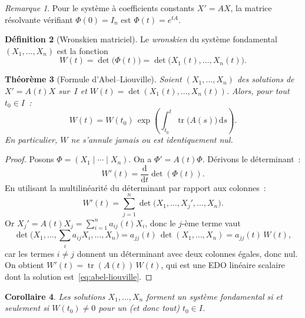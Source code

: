 \documentclass[12pt,a4paper,openany]{book}
\theoremstyle{definition}
\newtheorem{definition}{Définition}[chapter]
\theoremstyle{plain}
\newtheorem{theoreme}[definition]{Théorème}
\newtheorem{corollaire}[definition]{Corollaire}
\theoremstyle{remark}
\newtheorem{remarque}[definition]{Remarque}
\newcommand{\dd}{\mathrm{d}}
\DeclareMathOperator{\tr}{tr}
\begin{document}
\begin{remarque}\label{rem:resolvante-exp}
  Pour le système à coefficients constants $X' = AX$, la matrice
  résolvante vérifiant $\Phi(0) = I_n$ est $\Phi(t) = e^{tA}$.
\end{remarque}

\begin{definition}[Wronskien matriciel]\label{def:wronskien-matriciel}
  Le \emph{wronskien} du système fondamental $(X_1,\ldots,X_n)$ est
  la fonction
  \[
    W(t) = \det\bigl(\Phi(t)\bigr) = \det\bigl(X_1(t),\ldots,X_n(t)\bigr).
  \]
\end{definition}

\begin{theoreme}[Formule d'Abel--Liouville]\label{thm:abel-liouville}
  Soient $(X_1,\ldots,X_n)$ des solutions de $X' = A(t)X$ sur~$I$ et
  $W(t) = \det(X_1(t),\ldots,X_n(t))$. Alors, pour tout $t_0 \in I$~:
  \begin{equation}\label{eq:abel-liouville}
    W(t) = W(t_0)\,\exp\!\left(\int_{t_0}^{t} \tr\bigl(A(s)\bigr)\,\dd s\right).
  \end{equation}
  En particulier, $W$ ne s'annule jamais ou est identiquement nul.
\end{theoreme}

\begin{proof}
  Posons $\Phi = (X_1 \mid \cdots \mid X_n)$. On a
  $\Phi' = A(t)\Phi$. Dérivons le déterminant~:
  \[
    W'(t) = \frac{\dd}{\dd t}\det(\Phi(t)).
  \]
  En utilisant la multilinéarité du déterminant par rapport aux colonnes~:
  \[
    W'(t) = \sum_{j=1}^{n} \det\bigl(X_1,\ldots,X_j',\ldots,X_n\bigr).
  \]
  Or $X_j' = A(t)X_j = \sum_{i=1}^n a_{ij}(t) X_i$, donc le $j$-ème
  terme vaut
  \[
    \det\bigl(X_1,\ldots,\textstyle\sum_i a_{ij} X_i,\ldots,X_n\bigr)
    = a_{jj}(t)\,\det(X_1,\ldots,X_n) = a_{jj}(t)\,W(t),
  \]
  car les termes $i \neq j$ donnent un déterminant avec deux colonnes
  égales, donc nul. On obtient $W'(t) = \tr(A(t))\,W(t)$, qui est
  une EDO linéaire scalaire dont la solution est~\eqref{eq:abel-liouville}.
\end{proof}

\begin{corollaire}\label{cor:wronskien-non-nul}
  Les solutions $X_1,\ldots,X_n$ forment un système fondamental si et
  seulement si $W(t_0) \neq 0$ pour un (et donc tout) $t_0 \in I$.
\end{corollaire}
\end{document}
